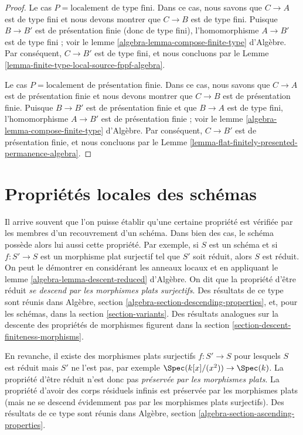 \begin{proof}
\medskip\noindent
Le cas $P = \text{localement de type fini}$. Dans ce cas, nous savons que
$C \to A$ est de type fini et nous devons montrer que $C \to B$ est de
type fini. Puisque $B \to B'$ est de présentation finie (donc de type
fini), l'homomorphisme $A \to B'$ est de type fini ; voir le lemme
\ref{algebra-lemma-compose-finite-type} d'Algèbre. Par conséquent,
$C \to B'$ est de type fini, et nous concluons par le
Lemme \ref{lemma-finite-type-local-source-fppf-algebra}.

\medskip\noindent
Le cas $P = \text{localement de présentation finie}$. Dans ce cas, nous savons
que $C \to A$ est de présentation finie et nous devons montrer que
$C \to B$ est de présentation finie. Puisque $B \to B'$ est de
présentation finie et que $B \to A$ est de type fini, l'homomorphisme
$A \to B'$ est de présentation finie ; voir le lemme
\ref{algebra-lemma-compose-finite-type} d'Algèbre. Par conséquent,
$C \to B'$ est de présentation finie, et nous concluons par le
Lemme \ref{lemma-flat-finitely-presented-permanence-algebra}.
\end{proof}










\section{Propriétés locales des schémas}
\label{section-descending-properties}

\noindent
Il arrive souvent que l'on puisse établir qu'une certaine propriété est
vérifiée par les membres d'un recouvrement d'un schéma. Dans bien des cas,
le schéma possède alors lui aussi cette propriété. Par exemple, si $S$ est
un schéma et si $f : S' \to S$ est un morphisme plat surjectif tel que $S'$
soit réduit, alors $S$ est réduit. On peut le démontrer en considérant les
anneaux locaux et en appliquant le lemme
\ref{algebra-lemma-descent-reduced} d'Algèbre. On dit que la propriété d'être
réduit {\it se descend par les morphismes plats surjectifs}. Des résultats de
ce type sont réunis dans Algèbre, section
\ref{algebra-section-descending-properties}, et, pour les schémas, dans la
section \ref{section-variants}. Des résultats analogues sur la descente des
propriétés de morphismes figurent dans la
section \ref{section-descent-finiteness-morphisms}.

\medskip\noindent
En revanche, il existe des morphismes plats surjectifs $f : S' \to S$ pour
lesquels $S$ est réduit mais $S'$ ne l'est pas, par exemple
$\Spec(k[x]/(x^2)) \to \Spec(k)$. La propriété d'être réduit n'est donc pas
{\it préservée par les morphismes plats}. La propriété d'avoir des corps
résiduels infinis est préservée par les morphismes plats (mais ne se descend
évidemment pas par les morphismes plats surjectifs). Des résultats de ce
type sont réunis dans Algèbre, section
\ref{algebra-section-ascending-properties}.

